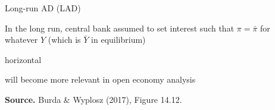 \documentclass{beamer}
\newcommand{\tb}[1]{{\color{blue}{\textbf{#1}}}}
\newenvironment{mytemize}
{\vfill\itemize[nolistsep,itemsep=\fill,label=\color{blue}{$\triangleright$}]}
  {\enditemize}
\begin{document}
\begin{frame}{Long-run AD (LAD)}
  \begin{mytemize}
	\item In the long run, central bank assumed to set interest such that $\pi = \bar \pi$ for whatever $Y$ (which is $\bar Y$ in equilibrium) 
	\begin{mytemize}
	\item horizontal \tb{LAD}
	\item will become more relevant in open economy analysis
	\end{mytemize}
  \end{mytemize}
\begin{center}
\begin{figure}[h!]
\end{figure}
\begin{minipage}{0.5\columnwidth}
\tiny	
\textbf{Source.} Burda \& Wyplosz (2017), Figure 14.12.\\
\end{minipage}
\end{center}
\end{frame}
\end{document}
